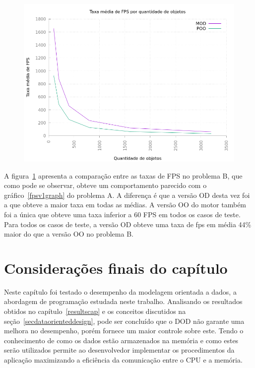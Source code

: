 \begin{figure}[h!]
    \centering
    \includegraphics[width =\textwidth]{../figuras/fpsv2}
    \par\medskip
    \label{fpsv2graph}
\end{figure}

A figura~\ref{fpsv2graph} apresenta a comparação entre as taxas de FPS no problema 
B, que como pode se observar, obteve um comportamento parecido com o 
gráfico~\ref{fpsv1graph} do problema A. A diferença é que a versão OD desta vez 
foi a que obteve a maior taxa em todas as médias. A versão OO do motor também foi 
a única que obteve uma taxa inferior a 60 FPS em todos os casos de teste.
Para todos os casos de teste, a versão OD obteve uma taxa de fps em média 44\% 
maior do que a versão OO no problema B.

\section{Considerações finais do capítulo}

Neste capítulo foi testado o desempenho da modelagem orientada 
a dados, a abordagem de programação estudada neste trabalho. 
Analisando os resultados obtidos no capítulo~\ref{resultscap} e 
os conceitos discutidos na seção~\ref{secdataorienteddesign}, 
pode ser concluído que o DOD não garante uma melhora no desempenho, 
porém fornece um maior controle sobre este. Tendo o conhecimento de 
como os dados estão armazenados na memória e como estes serão 
utilizados permite ao desenvolvedor implementar os procedimentos 
da aplicação maximizando a eficiência da comunicação entre o 
CPU e a memória.

